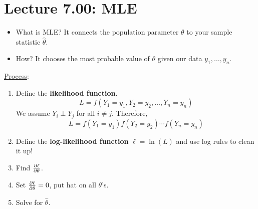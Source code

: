 \section{Lecture 7.00: MLE}
\begin{itemize}
    \item What is MLE\@? It connects the population parameter $ \theta $
          to your sample statistic $ \hat{\theta} $.
    \item How? It chooses the most probable value of $ \theta $
          given our data $ y_1,\ldots,y_n $.
\end{itemize}
\underline{Process}:
\begin{enumerate}[(1)]
    \item Define the \textbf{likelihood function}.
          \[ L=f(Y_1=y_1,Y_2=y_2,\ldots,Y_n=y_n) \]
          We assume $ Y_i\perp Y_j $ for all $ i\ne j $. Therefore,
          \[ L=f(Y_1=y_1)f(Y_2=y_2)\cdots f(Y_n=y_n) \]
    \item Define the \textbf{log-likelihood function} $ \ell=\ln(L) $ and use log rules to
          clean it up!
    \item Find $ \pdv{\ell}{\theta} $.
    \item Set $ \pdv{\ell}{\theta}=0 $, put hat on all $ \theta $'s.
    \item Solve for $ \hat{\theta} $.
\end{enumerate}
